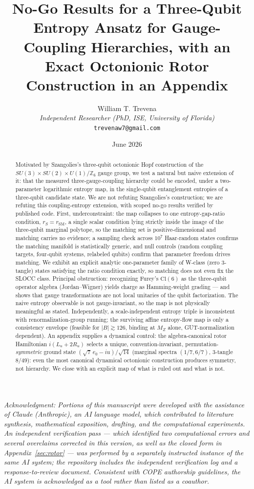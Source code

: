 \documentclass[11pt]{article}
\title{No-Go Results for a Three-Qubit Entropy Ansatz for Gauge-Coupling Hierarchies, with an Exact Octonionic Rotor Construction in an Appendix}
\author{William T. Trevena\\[3pt]
{\small\itshape Independent Researcher (PhD, ISE, University of Florida)}\\
{\small\texttt{trevenaw7@gmail.com}}}
\date{June 2026}
\newcommand{\rSM}{r_{\mathrm{SM}}}
\begin{document}
\maketitle

{\small\itshape Acknowledgment: Portions of this manuscript were developed with the assistance of Claude (Anthropic), an AI language model, which contributed to literature synthesis, mathematical exposition, drafting, and the computational experiments. An independent verification pass --- which identified two computational errors and several overclaims corrected in this version, as well as the closed form in Appendix~\ref{sec:rotor} --- was performed by a separately instructed instance of the same AI system; the repository includes the independent verification log and a response-to-review document. Consistent with COPE authorship guidelines, the AI system is acknowledged as a tool rather than listed as a coauthor.}

\begin{abstract}
Motivated by Szangolies's three-qubit octonionic Hopf construction of the $SU(3) \times SU(2) \times U(1)/\mathbb{Z}_6$ gauge group, we test a natural but naive extension of it: that the measured three-gauge-coupling hierarchy could be encoded, under a two-parameter logarithmic entropy map, in the single-qubit entanglement entropies of a three-qubit candidate state. We are not refuting Szangolies's construction; we are refuting this coupling-entropy extension, with scoped no-go results verified by published code. First, underconstraint: the map collapses to one entropy-gap-ratio condition, $r_S = \rSM$, a single scalar condition lying strictly inside the image of the three-qubit marginal polytope, so the matching set is positive-dimensional and matching carries no evidence; a sampling check across $10^7$ Haar-random states confirms the matching manifold is statistically generic, and null controls (random coupling targets, four-qubit systems, relabeled qubits) confirm that parameter freedom drives matching. We exhibit an explicit analytic one-parameter family of W-class (zero 3-tangle) states satisfying the ratio condition exactly, so matching does not even fix the SLOCC class. Principal obstruction: recognizing Furey's $\mathrm{Cl}(6)$ as the three-qubit operator algebra (Jordan--Wigner) yields charge as Hamming-weight grading --- and shows that gauge transformations are not local unitaries of the qubit factorization. The naive entropy observable is not gauge-invariant, so the map is not physically meaningful as stated. Independently, a scale-independent entropy triple is inconsistent with renormalization-group running; the surviving affine entropy-flow map is only a consistency envelope (feasible for $|B| \gtrsim 126$, binding at $M_Z$ alone, GUT-normalization dependent). An appendix supplies a dynamical control: the algebra-canonical rotor Hamiltonian $i(L_u + 2R_u)$ selects a unique, convention-invariant, permutation-\emph{symmetric} ground state $(\sqrt{7}\,e_0 - iu)/\sqrt{14}$ (marginal spectra $(1/7, 6/7)$, 3-tangle $8/49$): even the most canonical dynamical octonionic construction produces symmetry, not hierarchy. We close with an explicit map of what is ruled out and what is not.
\end{abstract}
\end{document}
